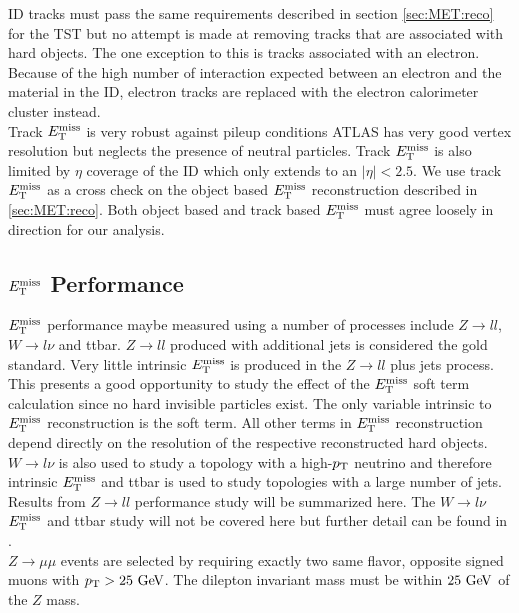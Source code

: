 \indent ID tracks must pass the same requirements described in section \ref{sec:MET:reco} for the TST but no attempt is made at removing tracks that are associated with hard objects.  The one exception to this is tracks associated with an electron.  Because of the high number of interaction expected between an electron and the material in the ID, electron tracks are replaced with the electron calorimeter cluster instead.  \\

\indent Track $E_{\mathrm{T}}^{\mathrm{miss}}$ is very robust against pileup conditions ATLAS has very good vertex resolution but neglects the presence of neutral particles.  Track $E_{\mathrm{T}}^{\mathrm{miss}}$ is also limited by $\eta$ coverage of the ID which only extends to an $|\eta| < 2.5$.  We use track $E_{\mathrm{T}}^{\mathrm{miss}}$ as a cross check on the object based $E_{\mathrm{T}}^{\mathrm{miss}}$ reconstruction described in \ref{sec:MET:reco}. Both object based and track based $E_{\mathrm{T}}^{\mathrm{miss}}$ must agree loosely in direction for our analysis.  \\

\subsection{$E_{\mathrm{T}}^{\mathrm{miss}}$ Performance}
\label{sec:reco:METPerform}

\indent $E_{\mathrm{T}}^{\mathrm{miss}}$ performance maybe measured using a number of processes include $Z\rightarrow ll$, $W\rightarrow l\nu$ and ttbar.  $Z\rightarrow ll$ produced with additional jets is considered the gold standard.  Very little intrinsic $E_{\mathrm{T}}^{\mathrm{miss}}$ is produced in the $Z\rightarrow ll$ plus jets process.  This presents a good opportunity to study the effect of the $E_{\mathrm{T}}^{\mathrm{miss}}$ soft term calculation since no hard invisible particles exist.  The only variable intrinsic to $E_{\mathrm{T}}^{\mathrm{miss}}$ reconstruction is the soft term.  All other terms in $E_{\mathrm{T}}^{\mathrm{miss}}$ reconstruction depend directly on the resolution of the respective reconstructed hard objects.  $W\rightarrow l\nu$ is also used to study a topology with a high-$p_{\mathrm{T}}$ neutrino and therefore intrinsic $E_{\mathrm{T}}^{\mathrm{miss}}$ and ttbar is used to study topologies with a large number of jets. \\

\indent Results from $Z\rightarrow ll$ performance study \cite{METReco} will be summarized here.  The $W\rightarrow l\nu$ $E_{\mathrm{T}}^{\mathrm{miss}}$ and ttbar study will not be covered here but further detail can be found in \cite{METReco}. \\

\indent $Z\rightarrow \mu\mu$ events are selected by requiring exactly two same flavor, opposite signed muons with $\pt > 25 \gev$. The dilepton invariant mass must be within $25 \gev$ of the $Z$ mass. \\

